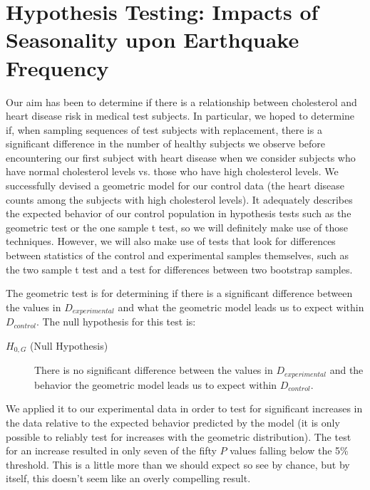 \documentclass{amsart}
\begin{document}
\section{Hypothesis Testing: Impacts of Seasonality upon Earthquake Frequency}
Our aim has been to determine if there is a relationship between cholesterol and heart disease risk in medical test subjects. In particular, we hoped to determine if, when sampling sequences of test subjects with replacement, there is a significant difference in the number of healthy subjects we observe before encountering our first subject with heart disease when we consider subjects who have normal cholesterol levels vs. those who have high cholesterol levels. We successfully devised a geometric model for our control data (the heart disease counts among the subjects with high cholesterol levels). It adequately describes the expected behavior of our control population in hypothesis tests such as the geometric test or the one sample t test, so we will definitely make use of those techniques. However,  we will also make use of tests that look for differences between statistics of the control and experimental samples themselves, such as the two sample t test and a test for differences between two bootstrap samples.

The geometric test is for determining if there is a significant difference between the values in $D_{experimental}$ and what the geometric model leads us to expect within $D_{control}$. The null hypothesis for this test is:
\begin{description}
\item[$H_{0,G}$ (Null Hypothesis)] There is no significant difference between the values in $D_{experimental}$ and the behavior the geometric model leads us to expect within $D_{control}$.
\end{description} 
We applied it to our experimental data in order to test for significant increases in the data relative to the expected behavior predicted by the model (it is only possible to reliably test for increases with the geometric distribution). The test for an increase resulted in only seven of the fifty $P$ values falling below the 5\% threshold. This is a little more than we should expect so see by chance, but by itself, this doesn't seem like an overly compelling result. 
\end{document}
